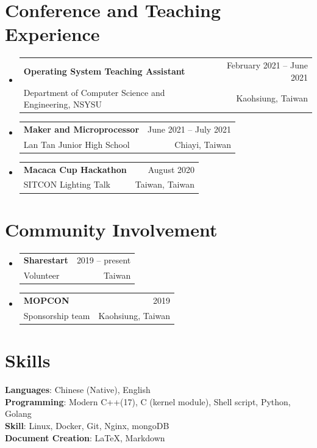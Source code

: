 \documentclass[A4,11pt]{article}
\makeatletter
\newcommand{\CVSubheading}[4]{
  \vspace{-2pt}\item
    \begin{tabular*}{0.97\textwidth}[t]{l@{\extracolsep{\fill}}r}
      \textbf{#1} & #2 \\
      \small#3 & \small #4 \\
    \end{tabular*}\vspace{-7pt}
}
\newcommand{\CVSubHeadingListStart}{\begin{itemize}[leftmargin=0.5cm, label={}]}
\newcommand{\CVSubHeadingListEnd}{\end{itemize}}
\makeatother
\begin{document}

\section{Conference and Teaching Experience}
\CVSubHeadingListStart
\CVSubheading
{Operating System Teaching Assistant}{February 2021 -- June 2021}
{Department of Computer Science and Engineering, NSYSU}{Kaohsiung, Taiwan}

\CVSubheading
{Maker and Microprocessor}{June 2021 -- July 2021}
{Lan Tan Junior High School}{Chiayi, Taiwan}

\CVSubheading
{Macaca Cup Hackathon}{August 2020}
{SITCON Lighting Talk}{Taiwan, Taiwan}

\CVSubHeadingListEnd

\section{Community Involvement}
\CVSubHeadingListStart
\CVSubheading
{Sharestart}{2019 -- present}{Volunteer}{Taiwan}
\CVSubheading
{MOPCON}{2019}{Sponsorship team}{Kaohsiung, Taiwan}
\CVSubHeadingListEnd

\section{Skills}
\begin{itemize}[leftmargin=0.5cm, label={}]
  \small{\item{
        \textbf{Languages}{: Chinese (Native), English} \\
        \textbf{Programming}{: Modern C++(17), C (kernel module), Shell script, Python, Golang } \\
        \textbf{Skill}{: Linux, Docker, Git, Nginx, mongoDB } \\
        \textbf{Document Creation}{: \LaTeX, Markdown} \\
        }}
\end{itemize}

\end{document}
